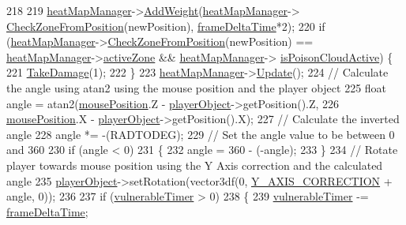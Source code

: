 \begin{DoxyCode}
218 
219     \hyperlink{_player_8cpp_a48dcebf2763626306e8357f05e6365cd}{heatMapManager}->\hyperlink{class_heat_map_manager_aaf3b56067a76a49a9685b221d63c87b9}{AddWeight}(\hyperlink{_player_8cpp_a48dcebf2763626306e8357f05e6365cd}{heatMapManager}->
      \hyperlink{class_heat_map_manager_a13bd9841f2166a91e2f3cf93671b82f9}{CheckZoneFromPosition}(newPosition), \hyperlink{_player_8cpp_adc988571147642cda93afbf89783f9c9}{frameDeltaTime}*2);
220     \textcolor{keywordflow}{if} (\hyperlink{_player_8cpp_a48dcebf2763626306e8357f05e6365cd}{heatMapManager}->\hyperlink{class_heat_map_manager_a13bd9841f2166a91e2f3cf93671b82f9}{CheckZoneFromPosition}(newPosition) == 
      \hyperlink{_player_8cpp_a48dcebf2763626306e8357f05e6365cd}{heatMapManager}->\hyperlink{class_heat_map_manager_a96bfbcb9d6326e12f37db7a9c4fd1e10}{activeZone} && \hyperlink{_player_8cpp_a48dcebf2763626306e8357f05e6365cd}{heatMapManager}->
      \hyperlink{class_heat_map_manager_affcd194d19a8b51c54bce180d1ca2393}{isPoisonCloudActive}) \{
221         \hyperlink{class_player_ae9f5a597f15e29673c47abe47c3f1d79}{TakeDamage}(1);
222     \}
223     \hyperlink{_player_8cpp_a48dcebf2763626306e8357f05e6365cd}{heatMapManager}->\hyperlink{class_heat_map_manager_ac11943d3f92891670ddf9e613d7c06dd}{Update}();
224     \textcolor{comment}{// Calculate the angle using atan2 using the mouse position and the player object}
225     \textcolor{keywordtype}{float} angle = atan2(\hyperlink{_player_8cpp_ac520dee6d1987f6ad92c8b0ff57fdf64}{mousePosition}.Z - \hyperlink{_player_8cpp_a0dc161b57661226afd81ffc4ba4f21d9}{playerObject}->getPosition().Z,
226         \hyperlink{_player_8cpp_ac520dee6d1987f6ad92c8b0ff57fdf64}{mousePosition}.X - \hyperlink{_player_8cpp_a0dc161b57661226afd81ffc4ba4f21d9}{playerObject}->getPosition().X);
227     \textcolor{comment}{// Calculate the inverted angle}
228     angle *= -(RADTODEG);
229     \textcolor{comment}{// Set the angle value to be between 0 and 360}
230     \textcolor{keywordflow}{if} (angle < 0)
231     \{
232         angle = 360 - (-angle);
233     \}
234     \textcolor{comment}{// Rotate player towards mouse position using the Y Axis correction and the calculated angle}
235     \hyperlink{_player_8cpp_a0dc161b57661226afd81ffc4ba4f21d9}{playerObject}->setRotation(vector3df(0, \hyperlink{_player_8cpp_a4e50a279e6f32b97d14aa23900330390}{Y\_AXIS\_CORRECTION} + angle, 0));
236 
237     \textcolor{keywordflow}{if} (\hyperlink{_player_8cpp_a73659202e903d625e27de1f6278ead6f}{vulnerableTimer} > 0)
238     \{
239         \hyperlink{_player_8cpp_a73659202e903d625e27de1f6278ead6f}{vulnerableTimer} -= \hyperlink{_player_8cpp_adc988571147642cda93afbf89783f9c9}{frameDeltaTime};

\end{DoxyCode}
